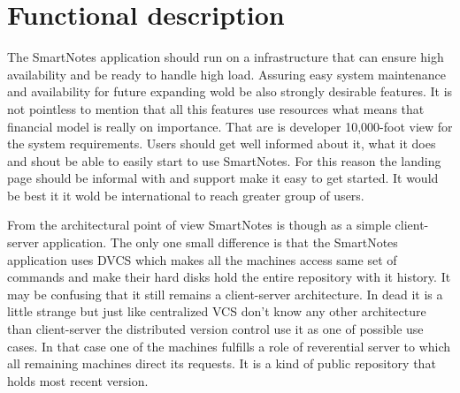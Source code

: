 \section{Functional description}\label{sec:functional_descr}
The SmartNotes application should run on a infrastructure that can ensure high availability and be ready to handle high load. Assuring easy system maintenance and availability for future expanding wold be also strongly desirable features. It is not pointless to mention that all this features use resources what means that financial model is really on importance. That are is developer 10,000-foot view for the system requirements.
Users should get well informed about it, what it does and shout be able to easily start to use SmartNotes. For this reason the landing page should be informal with and support make it easy to get started. It would be best it it wold be international to reach greater group of users.

From the architectural point of view SmartNotes is though as a simple client-server application. The only one small difference is that the SmartNotes application uses DVCS which makes all the machines access same set of commands and make their hard disks hold the entire repository with it history. It may be confusing that it still remains a client-server architecture. In dead it is a little strange but just like centralized VCS don't know any other architecture than client-server the distributed version control use it as one of possible use cases. In that case one of the machines fulfills a role of reverential server to which all remaining machines direct its requests. It is a kind of public repository that holds most recent version.

